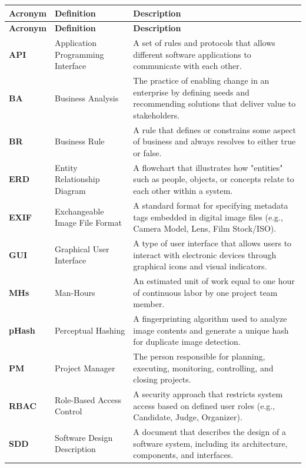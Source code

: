\documentclass[12pt,a4paper]{article}
\begin{document}
\begin{longtable}{|p{2.2cm}|p{4.4cm}|p{7.0cm}|}
    \hline
    \rowcolor{headerblue} \textbf{Acronym} & \textbf{Definition} & \textbf{Description} \\ \hline
    \endfirsthead
    \hline
    \rowcolor{headerblue} \textbf{Acronym} & \textbf{Definition} & \textbf{Description} \\ \hline
    \endhead
    \textbf{API} & Application Programming Interface & A set of rules and protocols that allows different software applications to communicate with each other. \\ \hline
    \textbf{BA} & Business Analysis & The practice of enabling change in an enterprise by defining needs and recommending solutions that deliver value to stakeholders. \\ \hline
    \textbf{BR} & Business Rule & A rule that defines or constrains some aspect of business and always resolves to either true or false. \\ \hline
    \textbf{ERD} & Entity Relationship Diagram & A flowchart that illustrates how "entities" such as people, objects, or concepts relate to each other within a system. \\ \hline
    \textbf{EXIF} & Exchangeable Image File Format & A standard format for specifying metadata tags embedded in digital image files (e.g., Camera Model, Lens, Film Stock/ISO). \\ \hline
    \textbf{GUI} & Graphical User Interface & A type of user interface that allows users to interact with electronic devices through graphical icons and visual indicators. \\ \hline
    \textbf{MHs} & Man-Hours & An estimated unit of work equal to one hour of continuous labor by one project team member. \\ \hline
    \textbf{pHash} & Perceptual Hashing & A fingerprinting algorithm used to analyze image contents and generate a unique hash for duplicate image detection. \\ \hline
    \textbf{PM} & Project Manager & The person responsible for planning, executing, monitoring, controlling, and closing projects. \\ \hline
    \textbf{RBAC} & Role-Based Access Control & A security approach that restricts system access based on defined user roles (e.g., Candidate, Judge, Organizer). \\ \hline
    \textbf{SDD} & Software Design Description & A document that describes the design of a software system, including its architecture, components, and interfaces. \\ \hline

\end{longtable}
\end{document}
